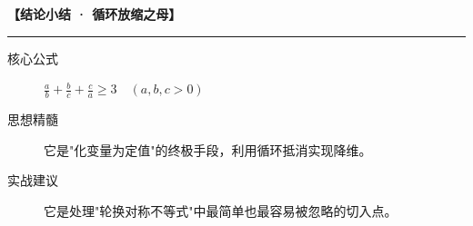 \begin{summarybox}
\textbf{【结论小结 · 循环放缩之母】}
\vspace{0.8em}
\hrule
\vspace{0.8em}

\begin{description}
    \item[核心公式] $\frac{a}{b} + \frac{b}{c} + \frac{c}{a} \geqslant 3 \quad (a,b,c > 0)$
    \item[思想精髓] 它是"化变量为定值"的终极手段，利用循环抵消实现降维。
    \item[实战建议] 它是处理"轮换对称不等式"中最简单也最容易被忽略的切入点。
\end{description}
\end{summarybox}